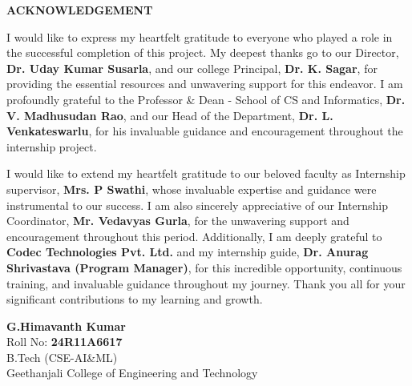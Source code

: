 \newpage
\thispagestyle{fancy}
\begin{center}
    {\fontsize{16}{20}\selectfont \textbf{ACKNOWLEDGEMENT}}\\[1.0cm]
\end{center}

\noindent I would like to express my heartfelt gratitude to everyone who played a role in the successful completion of this project. My deepest thanks go to our Director, \textbf{Dr. Uday Kumar Susarla}, and our college Principal, \textbf{Dr. K. Sagar}, for providing the essential resources and unwavering support for this endeavor. I am profoundly grateful to the Professor \& Dean - School of CS and Informatics, \textbf{Dr. V. Madhusudan Rao}, and our Head of the Department, \textbf{Dr. L. Venkateswarlu}, for his invaluable guidance and encouragement throughout the internship project.

\vspace{0.8cm}

\noindent I would like to extend my heartfelt gratitude to our beloved faculty as Internship supervisor, \textbf{Mrs. P Swathi}, whose invaluable expertise and guidance were instrumental to our success. I am also sincerely appreciative of our Internship Coordinator, \textbf{Mr. Vedavyas Gurla}, for the unwavering support and encouragement throughout this period. Additionally, I am deeply grateful to \textbf{Codec Technologies Pvt. Ltd.} and my internship guide, \textbf{Dr. Anurag Shrivastava (Program Manager)}, for this incredible opportunity, continuous training, and invaluable guidance throughout my journey. Thank you all for your significant contributions to my learning and growth.

\vspace{2.5cm}

\begin{flushright}
    \textbf{G.Himavanth Kumar}\\
    Roll No: \textbf{24R11A6617}\\
    B.Tech (CSE-AI\&ML)\\
    Geethanjali College of Engineering and Technology
\end{flushright}

